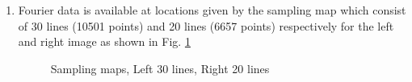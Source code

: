 \begin{enumerate}
\item Fourier data is available at locations given by the sampling map which consist of 30 lines (10501 points) and 20 lines (6657 points) respectively for the left and right image as shown in Fig. \ref{fig:expt32}
\begin{figure}[!t]
\hspace{-0.5in}
		\hspace{-1in}
\caption [Sampling maps, Left 30 lines, Right 20 lines]{Sampling maps, Left 30 lines, Right 20 lines}
\label{fig:expt32}
\end{figure}


\end{enumerate}
